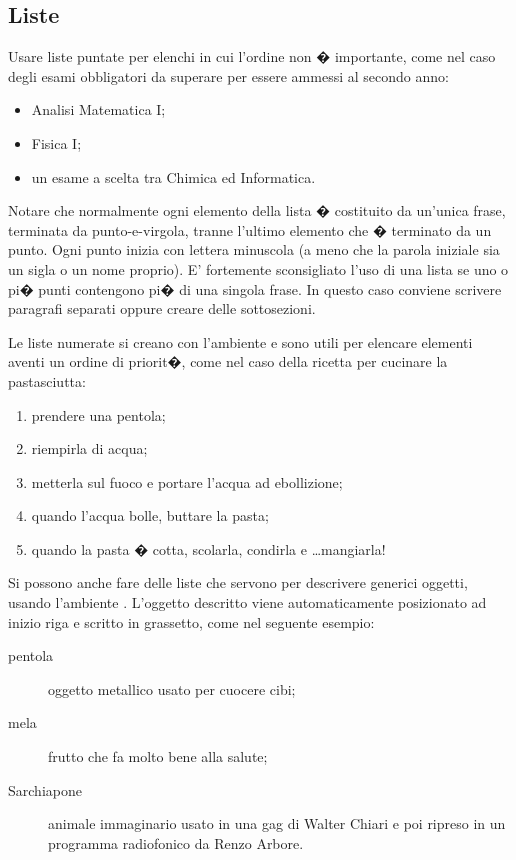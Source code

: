 
\subsection{Liste}

Usare liste puntate per elenchi in cui l'ordine non � importante, come nel caso degli esami obbligatori da superare per essere ammessi al secondo anno:
\begin{itemize}
\item
Analisi Matematica I;
\item
Fisica I;
\item
un esame a scelta tra Chimica ed Informatica.
\end{itemize}
Notare che normalmente ogni elemento della lista � costituito da un'unica frase, terminata da punto-e-virgola, tranne l'ultimo elemento che � terminato da un punto. Ogni punto inizia con lettera minuscola (a meno che la parola iniziale sia un sigla o un nome proprio). E' fortemente sconsigliato l'uso di una lista se uno o pi� punti contengono pi� di una singola frase. In questo caso conviene scrivere paragrafi separati oppure creare delle sottosezioni.

Le liste numerate si creano con l'ambiente  e sono utili per elencare elementi aventi un ordine di priorit�, come nel caso della ricetta per cucinare la pastasciutta:
\begin{enumerate}
\item
prendere una pentola;
\item
riempirla di acqua;
\item
metterla sul fuoco e portare l'acqua ad ebollizione;
\item
quando l'acqua bolle, buttare la pasta;
\item
quando la pasta � cotta, scolarla, condirla e \ldots mangiarla!
\end{enumerate}
Si possono anche fare delle liste che servono per descrivere generici oggetti, usando l'ambiente .
L'oggetto descritto viene automaticamente posizionato ad inizio riga e scritto in grassetto, come nel seguente esempio:
\begin{description}
\item[pentola]
oggetto metallico usato per cuocere cibi;
\item[mela]
frutto che fa molto bene alla salute;
\item[Sarchiapone] animale immaginario usato in una gag di Walter Chiari e poi ripreso in un programma radiofonico da Renzo Arbore.
\end{description}

